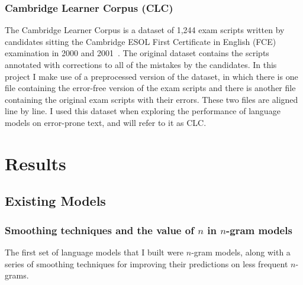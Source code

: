 \documentclass[a4paper, 12pt]{report}
\begin{document}
\subsubsection{Cambridge Learner Corpus (CLC)}

The Cambridge Learner Corpus is a dataset of 1,244 exam scripts written by candidates sitting the Cambridge ESOL First Certificate in English (FCE) examination in 2000 and 2001~\cite{clc:yannakoudakis2011}. The original dataset contains the scripts annotated with corrections to all of the mistakes by the candidates. In this project I make use of a preprocessed version of the dataset, in which there is one file containing the error-free version of the exam scripts and there is another file containing the original exam scripts with their errors. These two files are aligned line by line. I used this dataset when exploring the performance of language models on error-prone text, and will refer to it as CLC.

\section{Results}

\subsection{Existing Models}

\subsubsection*{Smoothing techniques and the value of $n$ in $n$-gram models}

The first set of language models that I built were $n$-gram models, along with a series of smoothing techniques for improving their predictions on less frequent $n$-grams.
\end{document}
